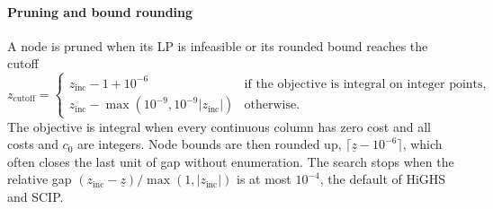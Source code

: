 \paragraph{Pruning and bound rounding}
A node is pruned when its LP is infeasible or its rounded bound reaches the cutoff
\begin{equation}\label{eq:cutoff}
  z_{\text{cutoff}} = \begin{cases} z_{\text{inc}} - 1 + 10^{-6} & \text{if the objective is integral on integer points},\\
  z_{\text{inc}} - \max(10^{-9}, 10^{-9}|z_{\text{inc}}|) & \text{otherwise.}\end{cases}
\end{equation}
The objective is integral when every continuous column has zero cost and all costs and $c_0$ are
integers. Node bounds are then rounded up, $\lceil \underline z - 10^{-6}\rceil$, which often closes
the last unit of gap without enumeration. The search stops when the relative gap
$(z_{\text{inc}}-\underline z)/\max(1,|z_{\text{inc}}|)$ is at most $10^{-4}$, the default of HiGHS
and SCIP.

